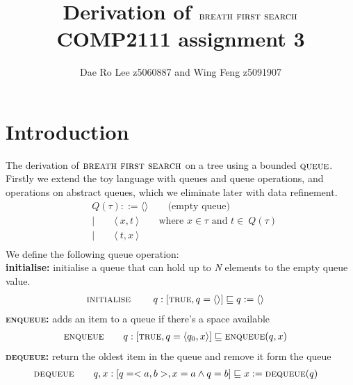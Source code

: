 \documentclass[headings=small,a4paper,12pt]{scrartcl}
\title{Derivation of $\bfs$\\
\large COMP2111 assignment 3}
\author{Dae Ro Lee z5060887 and Wing Feng z5091907}
\newcommand{\bfs}{\textsc{breath first search}\xspace}
\newcommand{\qu}{\textsc{queue}\xspace}
\newcommand{\enq}{\textsc{enqueue}\xspace}
\newcommand{\deq}{\textsc{dequeue}\xspace}
\newcommand{\ini}{\textsc{initialise}\xspace}
\begin{document}
\maketitle
%
\section{Introduction}
\label{sec:introduction}
The derivation of $\bfs$ on a tree using a bounded $\qu$.\\ 
%
Firstly we extend the toy language with queues and queue operations, and operations on abstract queues, which we eliminate later with data refinement. 
\begin{align*}
    &Q(\tau) ::= \langle\rangle\qquad\text{(empty queue)}\\
    &|\qquad\langle~x,t~\rangle\qquad\text{where $x\in\tau$ and $t\in~Q(\tau)$}\\
    &|\qquad\langle~t,x~\rangle\\
\end{align*}
We define the following queue operation:\\
\textbf{initialise:} initialise a queue that can hold up to \textit{N} elements to the empty queue value.
\begin{align*}
  &\ini\qquad~q :[\True, q = \langle\rangle] \isrefinedby q\Ass \langle\rangle
\end{align*}
\textbf{\enq:} adds an item to a queue if there's a space available 
\begin{align*}
  &\enq\qquad q:[\True, q=\langle q_0,x\rangle]\isrefinedby \enq(q,x)
\end{align*}
\textbf{\deq:} return the oldest item in the queue and remove it form the queue\\
\begin{align*}
  &\deq\qquad q,x:[q = <a,b>, x = a \And q = b] \isrefinedby x \Ass \deq(q) 
\end{align*}
%
\end{document}
